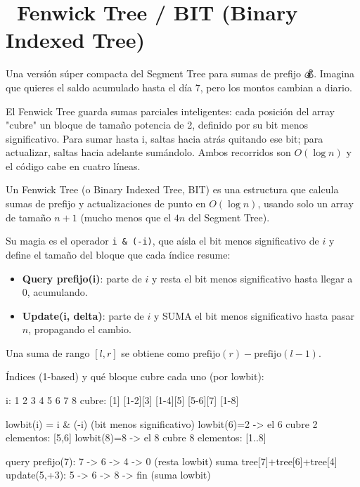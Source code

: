 \chapter[\emj{🌲}~Fenwick Tree / BIT (Binary Indexed Tree)]{~Fenwick Tree / BIT (Binary Indexed Tree)}

\begin{dsaquees}

Una versión súper compacta del Segment Tree para sumas de prefijo 💰.
Imagina que quieres el saldo acumulado hasta el día 7, pero los montos
cambian a diario.

El Fenwick Tree guarda sumas parciales inteligentes: cada posición del
array "cubre" un bloque de tamaño potencia de 2, definido por su bit
menos significativo. Para sumar hasta i, saltas hacia atrás quitando ese
bit; para actualizar, saltas hacia adelante sumándolo. Ambos recorridos
son $O(\log n)$ y el código cabe en cuatro líneas.

\end{dsaquees}

\begin{dsaotraforma}

Un Fenwick Tree (o Binary Indexed Tree, BIT) es una estructura que
calcula sumas de prefijo y actualizaciones de punto en $O(\log n)$,
usando solo un array de tamaño $n+1$ (mucho menos que el $4n$ del Segment
Tree).

Su magia es el operador \verb|i & (-i)|, que aísla el bit menos
significativo de $i$ y define el tamaño del bloque que cada índice
resume:
\begin{itemize}
\item \textbf{Query prefijo(i)}: parte de $i$ y resta el bit menos
      significativo hasta llegar a 0, acumulando.
\item \textbf{Update(i, delta)}: parte de $i$ y SUMA el bit menos
      significativo hasta pasar $n$, propagando el cambio.
\end{itemize}

Una suma de rango $[l, r]$ se obtiene como $\mathrm{prefijo}(r) -
\mathrm{prefijo}(l-1)$.

\end{dsaotraforma}

\begin{dsadiagrama}
Índices (1-based) y qué bloque cubre cada uno (por lowbit):

  i:     1    2    3    4    5    6    7    8
  cubre: [1] [1-2][3] [1-4][5] [5-6][7] [1-8]

lowbit(i) = i & (-i)   (bit menos significativo)
  lowbit(6)=2 -> el 6 cubre 2 elementos: [5,6]
  lowbit(8)=8 -> el 8 cubre 8 elementos: [1..8]

query prefijo(7): 7 -> 6 -> 4 -> 0   (resta lowbit)
                  suma tree[7]+tree[6]+tree[4]
update(5,+3):     5 -> 6 -> 8 -> fin  (suma lowbit)
\end{dsadiagrama}

